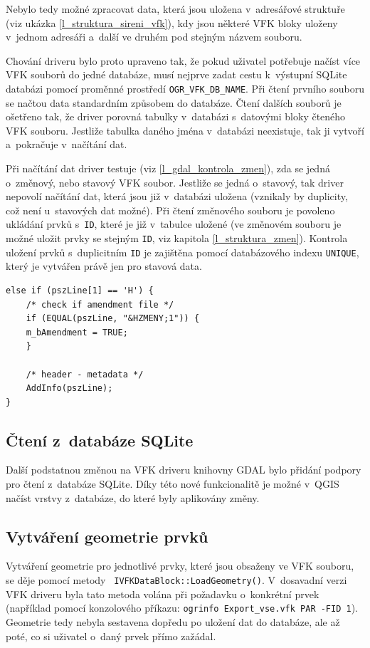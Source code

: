 \documentclass[a4paper,12pt,oneside]{book}
\begin{document}
Nebylo tedy možné zpracovat data, která jsou uložena v~adresářové
struktuře (viz ukázka \ref{l_struktura_sireni_vfk}), kdy jsou některé
VFK bloky uloženy v~jednom adresáři a~další ve druhém pod stejným
názvem souboru.

Chování driveru bylo proto upraveno tak, že pokud uživatel potřebuje
načíst více VFK souborů do jedné databáze, musí nejprve zadat cestu
k~výstupní SQLite databázi pomocí proměnné prostředí
\texttt{OGR\_VFK\_DB\_NAME}. Při čtení prvního souboru se načtou data
standardním způsobem do databáze. Čtení dalších souborů je ošetřeno
tak, že driver porovná tabulky v~databázi s~datovými bloky čteného VFK
souboru. Jestliže tabulka daného jména v~databázi neexistuje, tak ji
vytvoří a~pokračuje v~načítání dat.

Při načítání dat driver testuje (viz \ref{l_gdal_kontrola_zmen}), zda
se jedná o~změnový, nebo stavový VFK soubor. Jestliže se jedná
o~stavový, tak driver nepovolí načítání dat, která jsou již v~databázi
uložena (vznikaly by duplicity, což není u~stavových dat možné). Při
čtení změnového souboru je povoleno ukládání prvků s~\texttt{ID},
které je již v~tabulce uložené (ve změnovém souboru je možné uložit
prvky se stejným \texttt{ID}, viz kapitola
\ref{l_struktura_zmen}). Kontrola uložení prvků s~duplicitním
\texttt{ID} je zajištěna pomocí databázového indexu \texttt{UNIQUE},
který je vytvářen právě jen pro stavová data.

\newpage
{\scriptsize
\begin{lstlisting}[style=c++, 
		    caption={Výňatek z~kódu pro kontrolu změnového souboru}, 
		    label=l_gdal_kontrola_zmen]
else if (pszLine[1] == 'H') {
    /* check if amendment file */
    if (EQUAL(pszLine, "&HZMENY;1")) {
	m_bAmendment = TRUE;
    }

    /* header - metadata */
    AddInfo(pszLine);
}
\end{lstlisting}
}

\subsection{Čtení z~databáze SQLite}
Další podstatnou změnou na VFK driveru knihovny GDAL bylo přidání
podpory pro čtení z~databáze SQLite. Díky této nové funkcionalitě je
možné v~QGIS načíst vrstvy z~databáze, do které byly aplikovány změny.

\subsection{Vytváření geometrie prvků}
Vytváření geometrie pro jednotlivé prvky, které jsou obsaženy ve VFK
souboru, se děje pomocí metody \texttt{
  IVFKDataBlock::LoadGeometry()}. V~dosavadní verzi VFK driveru byla
tato metoda volána při požadavku o~konkrétní prvek (například pomocí
konzolového příkazu: \texttt{ogrinfo Export\_vse.vfk PAR -FID
  1}). Geometrie tedy nebyla sestavena dopředu po uložení dat do
databáze, ale až poté, co si uživatel o~daný prvek přímo zažádal.
\end{document}

